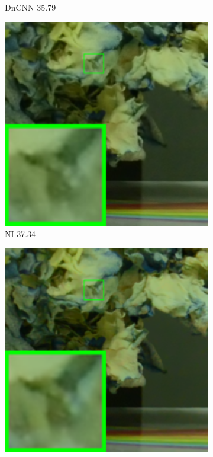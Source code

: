 \begin{figure}
\begin{subfigure}[t]{0.19\textwidth}
\caption{DnCNN 35.79}
    \end{subfigure}
\hfill
    \begin{subfigure}[t]{0.19\textwidth}
        \centering
        \includegraphics[width=1\textwidth]{images/twsc/cc/resize_br_NI_d800_iso1600_1_real.png}
\caption{NI 37.34}
    \end{subfigure}
\hfill
    \begin{subfigure}[t]{0.19\textwidth}
        \centering
        \includegraphics[width=1\textwidth]{images/twsc/cc/resize_br_NC_d800_iso1600_1_real.png}

\end{subfigure}
\end{figure}
